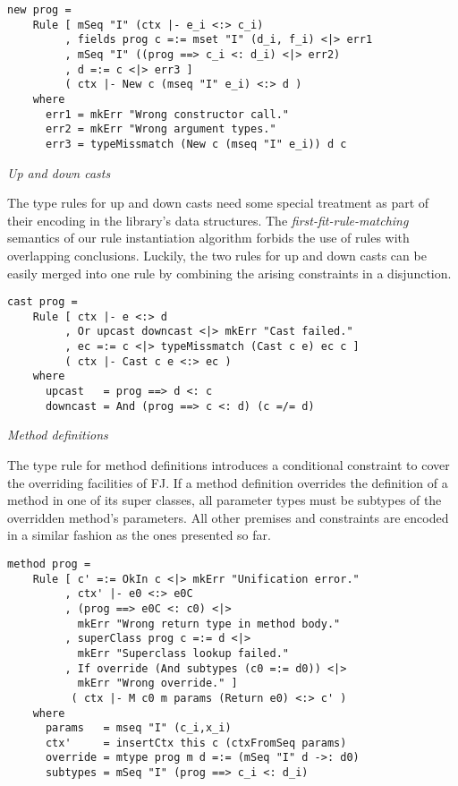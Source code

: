\begin{lstlisting}
new prog = 
    Rule [ mSeq "I" (ctx |- e_i <:> c_i)
         , fields prog c =:= mset "I" (d_i, f_i) <|> err1
         , mSeq "I" ((prog ==> c_i <: d_i) <|> err2)
         , d =:= c <|> err3 ]
         ( ctx |- New c (mseq "I" e_i) <:> d )
    where
      err1 = mkErr "Wrong constructor call."
      err2 = mkErr "Wrong argument types."
      err3 = typeMissmatch (New c (mseq "I" e_i)) d c
\end{lstlisting}

\newpage

\bigskip\textit{Up and down casts}

\smallskip

The type rules for up and down casts need some special treatment as
part of their encoding in the library's data structures. The
\textit{first-fit-rule-matching} semantics of our rule instantiation
algorithm forbids the use of rules with overlapping
conclusions. Luckily, the two rules for up and down casts can be
easily merged into one rule by combining the arising constraints in a
disjunction.

\begin{lstlisting}
cast prog =
    Rule [ ctx |- e <:> d
         , Or upcast downcast <|> mkErr "Cast failed."
         , ec =:= c <|> typeMissmatch (Cast c e) ec c ]
         ( ctx |- Cast c e <:> ec )
    where
      upcast   = prog ==> d <: c
      downcast = And (prog ==> c <: d) (c =/= d)
\end{lstlisting}

\bigskip\textit{Method definitions}

\smallskip

The type rule for method definitions introduces a conditional
constraint to cover the overriding facilities of \textsc{FJ}. If a
method definition overrides the definition of a method in one of its
super classes, all parameter types must be subtypes of the overridden
method's parameters. All other premises and constraints are encoded in
a similar fashion as the ones presented so far.

\begin{lstlisting}
method prog =
    Rule [ c' =:= OkIn c <|> mkErr "Unification error."
         , ctx' |- e0 <:> e0C
         , (prog ==> e0C <: c0) <|>
           mkErr "Wrong return type in method body."
         , superClass prog c =:= d <|>
           mkErr "Superclass lookup failed."
         , If override (And subtypes (c0 =:= d0)) <|>
           mkErr "Wrong override." ]
          ( ctx |- M c0 m params (Return e0) <:> c' )
    where
      params   = mseq "I" (c_i,x_i)
      ctx'     = insertCtx this c (ctxFromSeq params)
      override = mtype prog m d =:= (mSeq "I" d ->: d0)
      subtypes = mSeq "I" (prog ==> c_i <: d_i)
\end{lstlisting}

